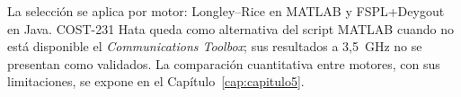 La selección se aplica por motor: Longley--Rice en MATLAB y FSPL+Deygout en Java. COST-231
Hata queda como alternativa del script MATLAB cuando no está disponible el
\textit{Communications Toolbox}; sus resultados a 3,5~GHz no se presentan como validados.
La comparación cuantitativa entre motores, con sus limitaciones, se expone en el
Capítulo~\ref{cap:capitulo5}.
